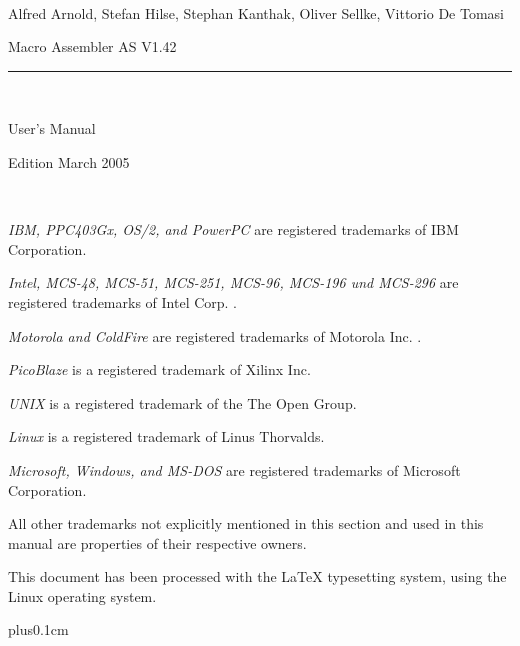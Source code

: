 \documentclass[12pt,twoside]{report}
\begin{document}
\thispagestyle{empty}

\
\vspace{7cm}\par

\begin{raggedright}
{\large Alfred Arnold, Stefan Hilse, Stephan Kanthak, Oliver
 Sellke, Vittorio De Tomasi}
\vspace{1cm}\par
{\huge Macro Assembler AS V1.42}\\
\rule{9.5cm}{0.3mm}\\
\vspace{2mm}\par
{\huge User's Manual}

\vspace{1cm}\par

{\large Edition March 2005}
\end{raggedright}

\clearpage
\thispagestyle{empty}

\ \vspace{5cm}

{\em IBM, PPC403Gx, OS/2, and PowerPC} are registered trademarks of IBM
Corporation.

{\em Intel, MCS-48, MCS-51, MCS-251, MCS-96, MCS-196 und MCS-296} are
registered trademarks of Intel Corp. .

{\em Motorola and ColdFire} are registered trademarks of Motorola Inc. .

{\em PicoBlaze} is a registered trademark of Xilinx Inc.

{\em UNIX} is a registered trademark of the The Open Group.

{\em Linux} is a registered trademark of Linus Thorvalds.

{\em Microsoft, Windows, and MS-DOS} are registered trademarks of
Microsoft Corporation.

All other trademarks not explicitly mentioned in this section and used in
this manual are properties of their respective owners.

\vspace{6cm}

This document has been processed with the LaTeX typesetting system, using
the Linux operating system.

\clearpage


{\parskip 0cm plus0.1cm \tableofcontents}
\end{document}
